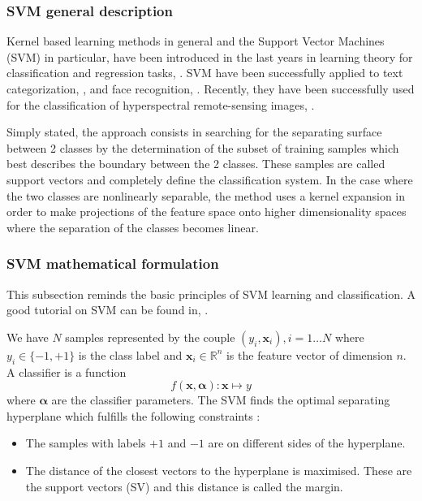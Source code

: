 \subsubsection{SVM general description}
Kernel based learning methods in general and the Support Vector
Machines (SVM) in particular, have been introduced in the last years
in learning theory for classification and regression tasks,
\cite{vapnik}. SVM have been successfully applied to text
categorization, \cite{joachims}, and face recognition,
\cite{osuna}. Recently, they have been successfully used for the
classification of hyperspectral remote-sensing images, \cite{bruzzoneSVM}.

Simply stated, the approach consists in searching for the separating
surface between 2 classes by the determination of the subset of
training samples which best describes the boundary between the 2
classes. These samples are called support vectors and completely
define the classification system. In the case where the two classes are
nonlinearly separable, the method uses a kernel expansion in order to make
projections of the feature space onto higher dimensionality spaces
where the separation of the classes becomes linear.


\subsubsection{SVM mathematical formulation}

This subsection reminds the basic principles of SVM learning and
classification. A good tutorial on SVM can be found in, \cite{burges}.
 
We have $N$ samples represented by the couple $(y_i,\mathbf{x}_i),
i=1\ldots N$ where $y_i \in \{-1,+1\}$ is the class label and
$\mathbf{x}_i \in \mathbb{R}^n$ is the feature vector of dimension
$n$. A classifier is a function  $$f(\mathbf{x},\boldsymbol{\alpha}) :
\mathbf{x}\mapsto y$$ where $\boldsymbol{\alpha}$ are the classifier
parameters. The SVM finds the optimal separating hyperplane which
fulfills the following constraints :
    \begin{itemize}
      \item The samples with labels $+1$ and $-1$ are on different
      sides of the hyperplane.
      \item The distance of the closest vectors to the hyperplane is
      maximised. These are the support vectors (SV) and this distance is
      called the margin.
    \end{itemize}


